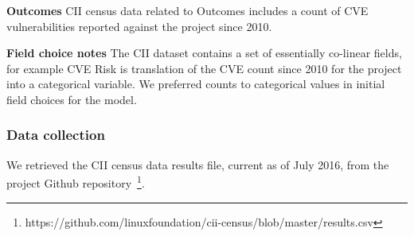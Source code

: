 \textbf{Outcomes}
CII census data related to Outcomes includes a count of CVE vulnerabilities reported against the project since 2010. 

\textbf{Field choice notes}
The CII dataset contains a set of essentially co-linear fields, for example CVE Risk is translation of the CVE count since 2010 for the project into a categorical variable. We preferred counts to categorical values in initial field choices for the model.

\subsubsection{Data collection}

We retrieved the CII census data results file, current as of July 2016, from the project Github repository~\footnote{https://github.com/linuxfoundation/cii-census/blob/master/results.csv}. 


